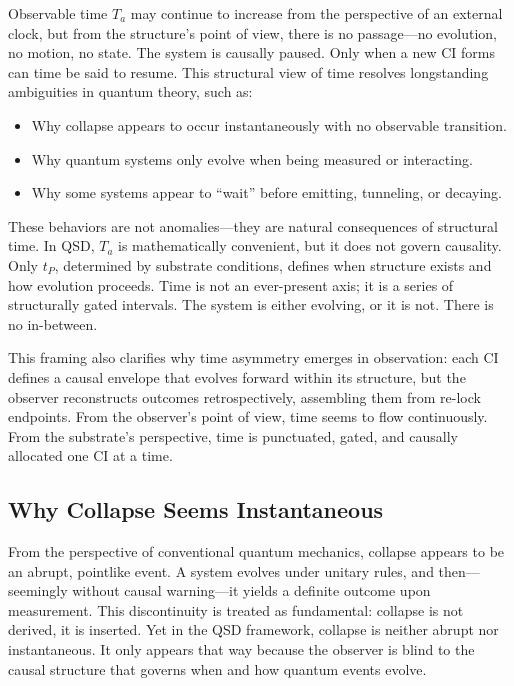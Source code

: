 \documentclass[preprints,article,submit,pdftex,moreauthors]{Definitions/mdpi}
\begin{document}
Observable time \(T_a\) may continue to increase from the perspective of an external clock, but from the structure’s point of view, there is no passage—no evolution, no motion, no state. The system is causally paused. Only when a new CI forms can time be said to resume. This structural view of time resolves longstanding ambiguities in quantum theory, such as:
\begin{itemize}
    \item Why collapse appears to occur instantaneously with no observable transition.
    \item Why quantum systems only evolve when being measured or interacting.
    \item Why some systems appear to “wait” before emitting, tunneling, or decaying.
\end{itemize}

These behaviors are not anomalies—they are natural consequences of structural time. In QSD, \(T_a\) is mathematically convenient, but it does not govern causality. Only \(t_P\), determined by substrate conditions, defines when structure exists and how evolution proceeds. Time is not an ever-present axis; it is a series of structurally gated intervals. The system is either evolving, or it is not. There is no in-between.

This framing also clarifies why time asymmetry emerges in observation: each CI defines a causal envelope that evolves forward within its structure, but the observer reconstructs outcomes retrospectively, assembling them from re-lock endpoints. From the observer’s point of view, time seems to flow continuously. From the substrate’s perspective, time is punctuated, gated, and causally allocated one CI at a time.

\subsection{Why Collapse Seems Instantaneous}

From the perspective of conventional quantum mechanics, collapse appears to be an abrupt, pointlike event. A system evolves under unitary rules, and then—seemingly without causal warning—it yields a definite outcome upon measurement. This discontinuity is treated as fundamental: collapse is not derived, it is inserted. Yet in the QSD framework, collapse is neither abrupt nor instantaneous. It only appears that way because the observer is blind to the causal structure that governs when and how quantum events evolve.
\end{document}
